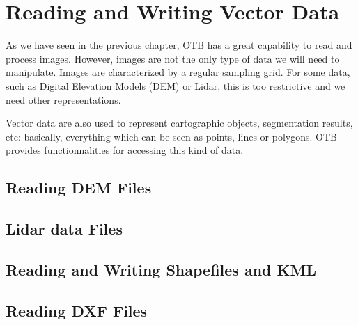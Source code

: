 \chapter{Reading and Writing Vector Data}
\label{sec:ReadingVectorData}

As we have seen in the previous chapter, OTB has a great capability to
read and process images. However, images are not the only type of data
we will need to manipulate. Images are characterized by a regular
sampling grid. For some data, such as Digital Elevation Models (DEM)
or Lidar, this is too restrictive and we need other representations.

Vector data are also used to represent cartographic objects,
segmentation results, etc: basically, everything which can be seen as
points, lines or polygons. OTB provides functionnalities for accessing
this kind of data.

\section{Reading DEM Files}
\label{sec:ReadDEM}


\section{Lidar data Files}
\label{sec:ReadLidar}



\section{Reading and Writing Shapefiles and KML}
\label{sec:ReadVectorData}


\section{Reading DXF Files}
\label{sec:ReadDXF}

